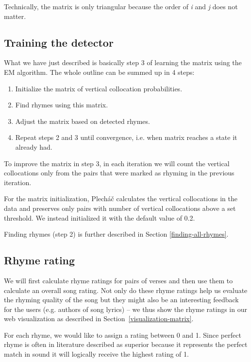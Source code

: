 Technically, the matrix is only triangular because the order of \textit{i} and \textit{j} does not matter.

\subsection{Training the detector} \label{analysis:training}
What we have just described is basically step 3 of learning the matrix using the EM algorithm. The whole outline can be summed up in 4 steps:
\begin{enumerate}
	\item Initialize the matrix of vertical collocation probabilities.
	\item Find rhymes using this matrix.
	\item Adjust the matrix based on detected rhymes.
	\item Repeat steps 2 and 3 until convergence, i.e. when matrix reaches a state it already had.
\end{enumerate} 

To improve the matrix in step 3, in each iteration we will count the vertical collocations only from the pairs that were marked as rhyming in the previous iteration.


For the matrix initialization, Plecháč calculates the vertical collocations in the data and preserves only pairs with number of vertical collocations above a set threshold. We instead initialized it with the default value of 0.2. 

Finding rhymes (step 2) is further described in Section \ref{finding-all-rhymes}.


\subsection{Rhyme rating}\label{rhyme-rating}
 We will first calculate rhyme ratings for pairs of verses and then use them to calculate an overall song rating. Not only do these rhyme ratings help us evaluate the rhyming quality of the song but they might also be an interesting feedback for the users (e.g. authors of song lyrics) -- we thus show the rhyme ratings in our web visualization as described in Section~\ref{visualization-matrix}.
 
 
 For each rhyme, we would like to assign a rating between 0 and 1. Since perfect rhyme is often in literature described as superior because it represents the perfect match in sound it will logically receive the highest rating of 1.
 

